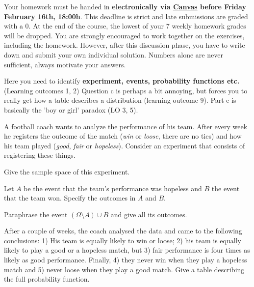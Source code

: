 \documentclass[a4paper,10pt,landscape,twocolumn]{scrartcl}
\newcommand\deadline{Friday February 16th, 18:00h}
\begin{document}
\homeworkproblems

{\sffamily\noindent
Your homework must be handed in \textbf{electronically via \href{https://canvas.uva.nl}{Canvas} before \deadline}. This deadline is strict and late submissions are graded with a 0. At the end of the course, the lowest of your 7 weekly homework grades will be dropped. You are strongly encouraged to work together on the exercises, including the homework. However, after this discussion phase, you have to write down and submit your own individual solution. Numbers alone are never sufficient, always motivate your answers.
}



\begin{exercise}[Hospitals (4pt)]
	\begin{mycomment}
	Here you need to identify \textbf{experiment, events, probability functions etc.} (Learning outcomes 1, 2) Question c is perhaps a bit annoying, but forces you to really get how a table describes a distribution (learning outcome 9). Part e is basically the 'boy or girl' paradox (LO 3, 5). 
	\end{mycomment}
	
	 A football coach wants to analyze the performance of his team. After every week he registers the outcome of the match (\emph{win} or \emph{loose}, there are no ties) and how his team played (\emph{good}, \emph{fair} or \emph{hopeless}). Consider an experiment that consists of registering these things.
	
	\begin{subex}[0.5pt]
		Give the sample space of this experiment.	
	\end{subex}
	
	\begin{subex}[0.5pt]
		Let $A$ be the event that the team's performance was hopeless and $B$ the event that the team won. Specify the outcomes in $A$ and $B$.
	\end{subex}

	\begin{subex}[1pt]
		Paraphrase the event $(\Omega \setminus A) \cup B$ and give all its outcomes.	
	\end{subex}
	
	\begin{subex}[1pt]
	After a couple of weeks, the coach analysed the data and came to the following conclusions: 1) His team is equally likely to win or loose; 2) his team is equally likely to play a good or a hopeless match, but 3)  fair performance is four times as likely as good performance. Finally, 4) they never win when they play a hopeless match and 5) never loose when they play a good match. Give a table describing the full probability function.
	\end{subex}


\end{exercise}
\end{document}
